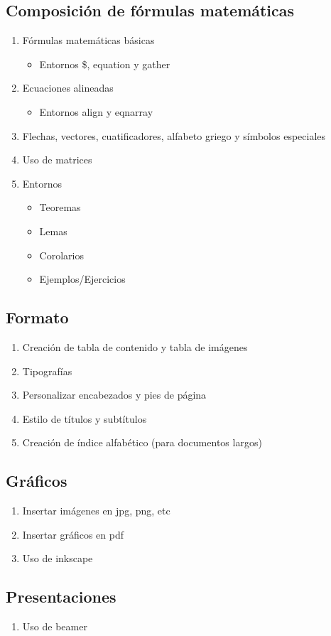 \documentclass[oneside,spanish]{article}
\theoremstyle{definition}
\theoremstyle{definition}\newtheorem{definicion}{Definición}
\theoremstyle{definition}\newtheorem{ejemplo}{Ejemplo}
\theoremstyle{remark}\newtheorem{nota}{\textsc{Nota}}
\theoremstyle{definition}\newtheorem{proposicion}{Proposición}
\theoremstyle{definition}\newtheorem{problema}{Problema}
\begin{document}
\subsection{Composición de fórmulas matemáticas}
\begin{enumerate}
\item	Fórmulas matemáticas básicas
\begin{itemize}
\item	Entornos \$, equation y gather
\end{itemize}
\item	Ecuaciones alineadas
\begin{itemize}
\item	Entornos align y eqnarray
\end{itemize}
\item	Flechas, vectores, cuatificadores, alfabeto griego y símbolos especiales
\item	Uso de matrices
\item	Entornos
\begin{itemize}
\item	Teoremas
\item	Lemas
\item	Corolarios
\item	Ejemplos/Ejercicios
\end{itemize}
\end{enumerate}

\subsection{Formato}
\begin{enumerate}
\item	Creación de tabla de contenido y tabla de imágenes
\item	Tipografías
\item	Personalizar encabezados y pies de página
\item	Estilo de títulos y subtítulos
\item	Creación de índice alfabético (para documentos largos)
\end{enumerate}

\subsection{Gráficos}
\begin{enumerate}
\item Insertar im\'agenes en jpg, png, etc
\item Insertar gr\'aficos en pdf
\item Uso de inkscape
\end{enumerate}

\subsection{Presentaciones}
\begin{enumerate}
\item Uso de beamer
\end{enumerate}
\end{document}
